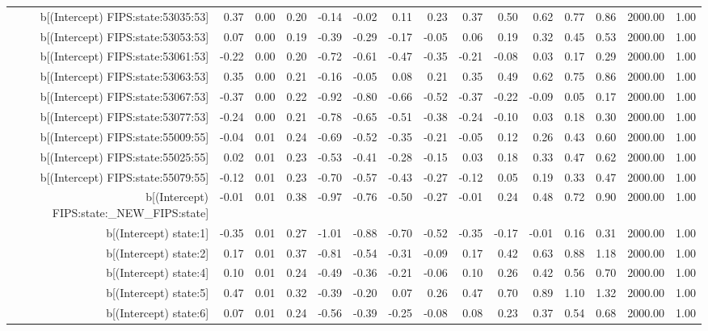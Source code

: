 \begin{table}[ht]
\begin{tabular}{rrrrrrrrrrrrrrr}
  b[(Intercept) FIPS:state:53035:53] & 0.37 & 0.00 & 0.20 & -0.14 & -0.02 & 0.11 & 0.23 & 0.37 & 0.50 & 0.62 & 0.77 & 0.86 & 2000.00 & 1.00 \\ 
  b[(Intercept) FIPS:state:53053:53] & 0.07 & 0.00 & 0.19 & -0.39 & -0.29 & -0.17 & -0.05 & 0.06 & 0.19 & 0.32 & 0.45 & 0.53 & 2000.00 & 1.00 \\ 
  b[(Intercept) FIPS:state:53061:53] & -0.22 & 0.00 & 0.20 & -0.72 & -0.61 & -0.47 & -0.35 & -0.21 & -0.08 & 0.03 & 0.17 & 0.29 & 2000.00 & 1.00 \\ 
  b[(Intercept) FIPS:state:53063:53] & 0.35 & 0.00 & 0.21 & -0.16 & -0.05 & 0.08 & 0.21 & 0.35 & 0.49 & 0.62 & 0.75 & 0.86 & 2000.00 & 1.00 \\ 
  b[(Intercept) FIPS:state:53067:53] & -0.37 & 0.00 & 0.22 & -0.92 & -0.80 & -0.66 & -0.52 & -0.37 & -0.22 & -0.09 & 0.05 & 0.17 & 2000.00 & 1.00 \\ 
  b[(Intercept) FIPS:state:53077:53] & -0.24 & 0.00 & 0.21 & -0.78 & -0.65 & -0.51 & -0.38 & -0.24 & -0.10 & 0.03 & 0.18 & 0.30 & 2000.00 & 1.00 \\ 
  b[(Intercept) FIPS:state:55009:55] & -0.04 & 0.01 & 0.24 & -0.69 & -0.52 & -0.35 & -0.21 & -0.05 & 0.12 & 0.26 & 0.43 & 0.60 & 2000.00 & 1.00 \\ 
  b[(Intercept) FIPS:state:55025:55] & 0.02 & 0.01 & 0.23 & -0.53 & -0.41 & -0.28 & -0.15 & 0.03 & 0.18 & 0.33 & 0.47 & 0.62 & 2000.00 & 1.00 \\ 
  b[(Intercept) FIPS:state:55079:55] & -0.12 & 0.01 & 0.23 & -0.70 & -0.57 & -0.43 & -0.27 & -0.12 & 0.05 & 0.19 & 0.33 & 0.47 & 2000.00 & 1.00 \\ 
  b[(Intercept) FIPS:state:\_NEW\_FIPS:state] & -0.01 & 0.01 & 0.38 & -0.97 & -0.76 & -0.50 & -0.27 & -0.01 & 0.24 & 0.48 & 0.72 & 0.90 & 2000.00 & 1.00 \\ 
  b[(Intercept) state:1] & -0.35 & 0.01 & 0.27 & -1.01 & -0.88 & -0.70 & -0.52 & -0.35 & -0.17 & -0.01 & 0.16 & 0.31 & 2000.00 & 1.00 \\ 
  b[(Intercept) state:2] & 0.17 & 0.01 & 0.37 & -0.81 & -0.54 & -0.31 & -0.09 & 0.17 & 0.42 & 0.63 & 0.88 & 1.18 & 2000.00 & 1.00 \\ 
  b[(Intercept) state:4] & 0.10 & 0.01 & 0.24 & -0.49 & -0.36 & -0.21 & -0.06 & 0.10 & 0.26 & 0.42 & 0.56 & 0.70 & 2000.00 & 1.00 \\ 
  b[(Intercept) state:5] & 0.47 & 0.01 & 0.32 & -0.39 & -0.20 & 0.07 & 0.26 & 0.47 & 0.70 & 0.89 & 1.10 & 1.32 & 2000.00 & 1.00 \\ 
  b[(Intercept) state:6] & 0.07 & 0.01 & 0.24 & -0.56 & -0.39 & -0.25 & -0.08 & 0.08 & 0.23 & 0.37 & 0.54 & 0.68 & 2000.00 & 1.00 \\ 

\end{tabular}
\end{table}

